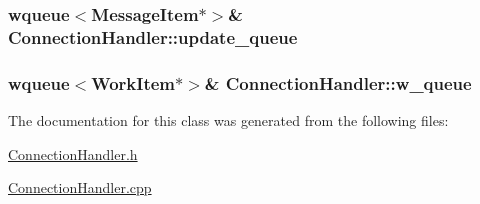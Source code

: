 \hypertarget{classConnectionHandler_a9a424cc085ebe9c63765301e7806ed87}{
\subsubsection[{update\+\_\+queue}]{\setlength{\rightskip}{0pt plus 5cm}wqueue$<${\bf Message\+Item}$\ast$$>$\& Connection\+Handler\+::update\+\_\+queue\hspace{0.3cm}{\ttfamily [private]}}}\label{classConnectionHandler_a9a424cc085ebe9c63765301e7806ed87}
\hypertarget{classConnectionHandler_a0bbfb37868698592cfda52d432a24c9f}{
\subsubsection[{w\+\_\+queue}]{\setlength{\rightskip}{0pt plus 5cm}wqueue$<${\bf Work\+Item}$\ast$$>$\& Connection\+Handler\+::w\+\_\+queue\hspace{0.3cm}{\ttfamily [private]}}}\label{classConnectionHandler_a0bbfb37868698592cfda52d432a24c9f}


The documentation for this class was generated from the following files\+:\begin{DoxyCompactItemize}
\item 
\hyperlink{ConnectionHandler_8h}{Connection\+Handler.\+h}\item 
\hyperlink{ConnectionHandler_8cpp}{Connection\+Handler.\+cpp}\end{DoxyCompactItemize}
